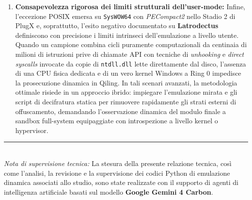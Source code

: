 \documentclass[11pt, a4paper]{article}
\begin{document}
\begin{enumerate}
	\item \textbf{Consapevolezza rigorosa dei limiti strutturali dell'user-mode:} Infine, l'eccezione POSIX emersa su \texttt{SysWOW64} con \textit{PECompact2} nello Stadio 2 di PlugX e, soprattutto, l'esito negativo documentato su \textbf{Latrodectus} definiscono con precisione i limiti intrinseci dell'emulazione a livello utente. Quando un campione combina cicli puramente computazionali da centinaia di milioni di istruzioni prive di chiamate API con tecniche di \textit{unhooking} e \textit{direct syscalls} invocate da copie di \texttt{ntdll.dll} lette direttamente dal disco, l'assenza di una CPU fisica dedicata e di un vero kernel Windows a Ring 0 impedisce la prosecuzione dinamica in Qiling. In tali scenari avanzati, la metodologia ottimale risiede in un approccio ibrido: impiegare l'emulazione mirata e gli script di decifratura statica per rimuovere rapidamente gli strati esterni di offuscamento, demandando l'osservazione dinamica del modulo finale a sandbox full-system equipaggiate con introspezione a livello kernel o hypervisor.
\end{enumerate}

\vspace{1.2cm}
\vfill
\noindent\rule{\textwidth}{0.4pt}\\[4pt]
{\scriptsize\color{muted}\textit{Nota di supervisione tecnica:} La stesura della presente relazione tecnica, cos\`i come l'analisi, la revisione e la supervisione dei codici Python di emulazione dinamica associati allo studio, sono state realizzate con il supporto di agenti di intelligenza artificiale basati sul modello \textbf{Google Gemini 4 Carbon}.}
\end{document}
